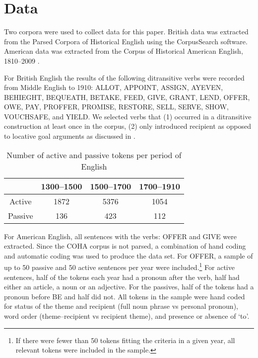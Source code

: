 \section{Data}
Two corpora were used to collect data for this paper. British data was extracted from the Parsed Corpora of Historical English \citep{Kroch.2000,Kroch.2004,Kroch.2010,Taylor.2006} using the CorpusSearch software. American data was extracted from the Corpus of Historical American English, 1810--2009 \citep{Davies.2010}.

For British English the results of the following ditransitive verbs were recorded from Middle English to 1910: ALLOT, APPOINT, ASSIGN, AYEVEN, BEHIEGHT, BEQUEATH, BETAKE, FEED, GIVE, GRANT, LEND, OFFER, OWE, PAY, PROFFER, PROMISE, RESTORE, SELL, SERVE, SHOW, VOUCHSAFE, and YIELD. We selected verbs that (1) occurred in a ditransitive construction at least once in the corpus, (2) only introduced recipient as opposed to locative goal arguments as discussed in \cite{Hovav.2008}.

\begin{table}[h!]
\begin{center}
\begin{tabular}{|c|c|c|c|}
\hline
 & 1300--1500 & 1500--1700 & 1700--1910 \\
\hline
Active & 1872 & 5376 & 1054 \\
\hline
Passive & 136 & 423 & 112 \\
\hline
\end{tabular}
\end{center}
\caption{Number of active and passive tokens per period of English}
\end{table}

For American English, all sentences with the verbs: OFFER and GIVE were extracted. Since the COHA corpus is not parsed, a combination of hand coding and automatic coding was used to produce the data set. For OFFER, a sample of up to 50 passive and 50 active sentences per year were included.\footnote{If there were fewer than 50 tokens fitting the criteria in a given year, all relevant tokens were included in the sample.} For active sentences, half of the tokens each year had a pronoun after the verb, half had either an article, a noun or an adjective. For the passives, half of the tokens had a pronoun before BE and half did not. All tokens in the sample were hand coded for status of the theme and recipient (full noun phrase vs personal pronoun), word order (theme--recipient vs recipient theme), and presence or absence of `to'.

